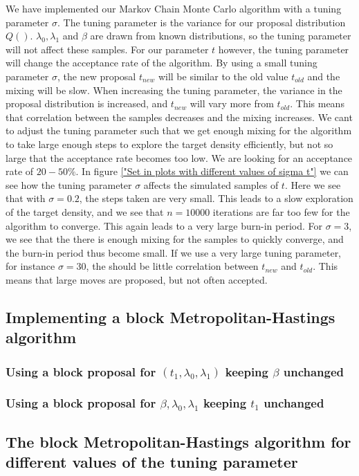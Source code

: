 We have implemented our Markov Chain Monte Carlo algorithm with a tuning parameter $\sigma$. The tuning parameter is the variance for our proposal distribution $Q()$. $\lambda_0, \lambda_1$ and $\beta$ are drawn from known distributions, so the tuning parameter will not affect these samples. For our parameter $t$ however, the tuning parameter will change the acceptance rate of the algorithm. By using a small tuning parameter $\sigma$, the new proposal $t_{new}$ will be similar to the old value $t_{old}$ and the mixing will be slow. When increasing the tuning parameter, the variance in the proposal distribution is increased, and $t_{new}$ will vary more from $t_{old}$. This means that correlation between the samples decreases and the mixing increases. We cant to adjust the tuning parameter such that we get enough mixing for the algorithm to take large enough steps to explore the target density efficiently, but not so large that the acceptance rate becomes too low. We are looking for an acceptance rate of $20 - 50\%$. In figure \ref{"Set in plots with different values of sigma t"} we can see how the tuning parameter $\sigma$ affects the simulated samples of $t$.  Here we see that with $\sigma = 0.2$, the steps taken are very small. This leads to a slow exploration of the target density, and we see that $n = 10000$ iterations are far too few for the algorithm to converge. This again leads to a very large burn-in period. For $\sigma = 3$, we see that the there is enough mixing for the samples to quickly converge, and the burn-in period thus become small. If we use a very large tuning parameter, for instance $\sigma = 30$, the should be little correlation between $t_{new}$ and $t_{old}$. This means that large moves are proposed, but not often accepted. 




\subsection{Implementing a block Metropolitan-Hastings algorithm}


\subsubsection{Using a block proposal for $(t_1, \lambda_0, \lambda_1)$ keeping $\beta$ unchanged}

\subsubsection{Using a block proposal for $\beta, \lambda_0, \lambda_1$ keeping $t_1$ unchanged}

\subsection{The block Metropolitan-Hastings algorithm for different values of the tuning parameter}